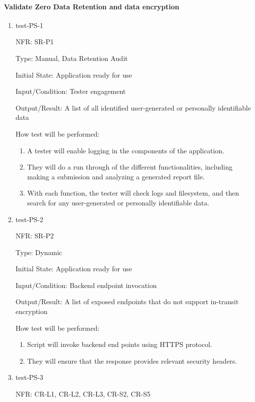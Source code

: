\documentclass[12pt, titlepage]{article}
\begin{document}
\paragraph{Validate Zero Data Retention and data encryption}
\begin{enumerate}
  \item{test-PS-1}
  
  NFR: SR-P1

  Type: Manual, Data Retention Audit

  Initial State: Application ready for use

  Input/Condition: Tester engagement

  Output/Result: A list of all identified user-generated or personally identifiable data

  How test will be performed:
  \begin{enumerate}
    \item A tester will enable logging in the components of the application.
    \item They will do a run through of the different functionalities, including 
    making a submission and analyzing a generated report file.
    \item With each function, the tester will check logs and filesystem, and then
    search for any user-generated or personally identifiable data.
  \end{enumerate}


  \item{test-PS-2}
  
  NFR: SR-P2 

  Type: Dynamic

  Initial State: Application ready for use

  Input/Condition: Backend endpoint invocation

  Output/Result: A list of exposed endpoints that do not support in-transit encryption

  How test will be performed:
  \begin{enumerate}
    \item Script will invoke backend end points using HTTPS protocol.
    \item They will ensure that the response provides relevant security headers.
  \end{enumerate}


  \item{test-PS-3}
  
  NFR: CR-L1, CR-L2, CR-L3, CR-S2, CR-S5


\end{enumerate}
\end{document}
